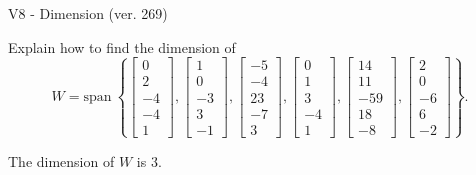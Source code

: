 \begin{exercise}
  \begin{exerciseTitle}V8 - Dimension (ver. 269)\end{exerciseTitle}
  \begin{exerciseStatement}
    Explain how to find the dimension of 
\[W=\mathrm{span}\ \left\{\left[\begin{array}{r}
0 \\
2 \\
-4 \\
-4 \\
1
\end{array}\right] , \left[\begin{array}{r}
1 \\
0 \\
-3 \\
3 \\
-1
\end{array}\right] , \left[\begin{array}{r}
-5 \\
-4 \\
23 \\
-7 \\
3
\end{array}\right] , \left[\begin{array}{r}
0 \\
1 \\
3 \\
-4 \\
1
\end{array}\right] , \left[\begin{array}{r}
14 \\
11 \\
-59 \\
18 \\
-8
\end{array}\right] , \left[\begin{array}{r}
2 \\
0 \\
-6 \\
6 \\
-2
\end{array}\right]\right\}.\]



  \end{exerciseStatement}
  \begin{exerciseAnswer}
   The dimension of \(W\) is  \(3\).
  


  \end{exerciseAnswer}
\end{exercise}